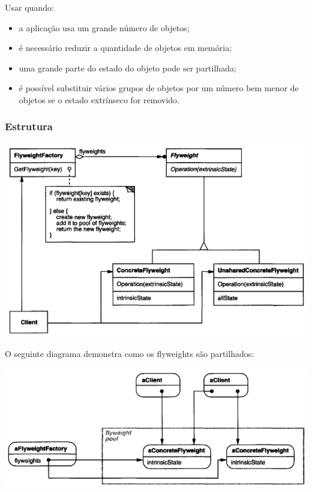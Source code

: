Usar quando:
\begin{itemize}
\item a aplicação usa um grande número de objetos;
\item é necessário reduzir a quantidade de objetos em memória;
\item uma grande parte do estado do objeto pode ser partilhada;
\item é possível substituir vários grupos de objetos por um número bem menor de objetos se o estado extrínseco for removido.
\end{itemize}

\subsubsection{Estrutura}

\centerline{\includegraphics[scale=.7]{img/flyweight/structure1.png}}

O seguinte diagrama demonstra como os flyweights são partilhados:

\centerline{\includegraphics[scale=.7]{img/flyweight/structure2.png}}

